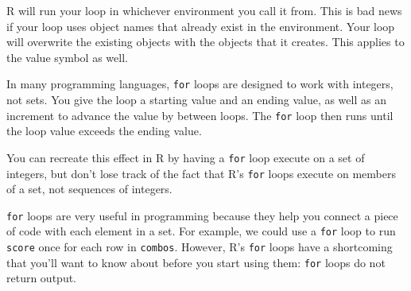 \documentclass[
  letterpaper,
  DIV=11,
  numbers=noendperiod]{scrbook}
\begin{document}
\begin{tcolorbox}[enhanced jigsaw, breakable, colback=white, colbacktitle=quarto-callout-warning-color!10!white, arc=.35mm, bottomrule=.15mm, coltitle=black, left=2mm, rightrule=.15mm, colframe=quarto-callout-warning-color-frame, leftrule=.75mm, opacitybacktitle=0.6, bottomtitle=1mm, toptitle=1mm, titlerule=0mm, opacityback=0, title=\textcolor{quarto-callout-warning-color}{\faExclamationTriangle}\hspace{0.5em}{Choose your symbols carefully}, toprule=.15mm]

R will run your loop in whichever environment you call it from. This is
bad news if your loop uses object names that already exist in the
environment. Your loop will overwrite the existing objects with the
objects that it creates. This applies to the value symbol as well.

\end{tcolorbox}

\begin{tcolorbox}[enhanced jigsaw, breakable, colback=white, colbacktitle=quarto-callout-tip-color!10!white, arc=.35mm, bottomrule=.15mm, coltitle=black, left=2mm, rightrule=.15mm, colframe=quarto-callout-tip-color-frame, leftrule=.75mm, opacitybacktitle=0.6, bottomtitle=1mm, toptitle=1mm, titlerule=0mm, opacityback=0, title=\textcolor{quarto-callout-tip-color}{\faLightbulb}\hspace{0.5em}{For loops run on sets}, toprule=.15mm]

In many programming languages, \texttt{for} loops are designed to work
with integers, not sets. You give the loop a starting value and an
ending value, as well as an increment to advance the value by between
loops. The \texttt{for} loop then runs until the loop value exceeds the
ending value.

You can recreate this effect in R by having a \texttt{for} loop execute
on a set of integers, but don't lose track of the fact that R's
\texttt{for} loops execute on members of a set, not sequences of
integers.

\end{tcolorbox}

\texttt{for} loops are very useful in programming because they help you
connect a piece of code with each element in a set. For example, we
could use a \texttt{for} loop to run \texttt{score} once for each row in
\texttt{combos}. However, R's \texttt{for} loops have a shortcoming that
you'll want to know about before you start using them: \texttt{for}
loops do not return output.
\end{document}
